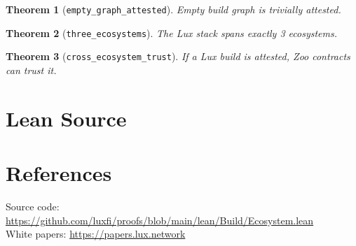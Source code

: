 \documentclass[11pt]{article}
\newtheorem{theorem}{Theorem}
\begin{document}
\begin{theorem}[\texttt{empty\_graph\_attested}]
Empty build graph is trivially attested.
\end{theorem}

\begin{theorem}[\texttt{three\_ecosystems}]
The Lux stack spans exactly 3 ecosystems.
\end{theorem}

\begin{theorem}[\texttt{cross\_ecosystem\_trust}]
If a Lux build is attested, Zoo contracts can trust it.
\end{theorem}


\section{Lean Source}


\section{References}
\noindent Source code: \url{https://github.com/luxfi/proofs/blob/main/lean/Build/Ecosystem.lean}\\
\noindent White papers: \url{https://papers.lux.network}
\end{document}
